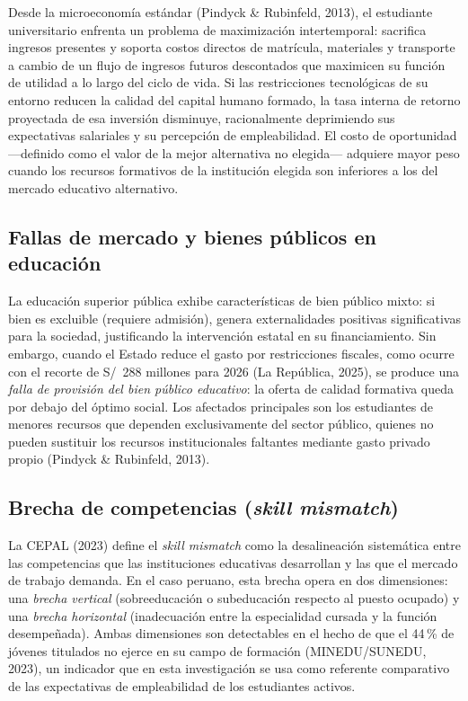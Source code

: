 \documentclass[11pt, a4paper]{article}
\begin{document}
Desde la microeconomía estándar (Pindyck \& Rubinfeld, 2013), el estudiante universitario enfrenta un problema de maximización intertemporal: sacrifica ingresos presentes y soporta costos directos de matrícula, materiales y transporte a cambio de un flujo de ingresos futuros descontados que maximicen su función de utilidad a lo largo del ciclo de vida. Si las restricciones tecnológicas de su entorno reducen la calidad del capital humano formado, la tasa interna de retorno proyectada de esa inversión disminuye, racionalmente deprimiendo sus expectativas salariales y su percepción de empleabilidad. El costo de oportunidad —definido como el valor de la mejor alternativa no elegida— adquiere mayor peso cuando los recursos formativos de la institución elegida son inferiores a los del mercado educativo alternativo.

\subsection{Fallas de mercado y bienes públicos en educación}

La educación superior pública exhibe características de bien público mixto: si bien es excluible (requiere admisión), genera externalidades positivas significativas para la sociedad, justificando la intervención estatal en su financiamiento. Sin embargo, cuando el Estado reduce el gasto por restricciones fiscales, como ocurre con el recorte de S/~288 millones para 2026 (La República, 2025), se produce una \textit{falla de provisión del bien público educativo}: la oferta de calidad formativa queda por debajo del óptimo social. Los afectados principales son los estudiantes de menores recursos que dependen exclusivamente del sector público, quienes no pueden sustituir los recursos institucionales faltantes mediante gasto privado propio (Pindyck \& Rubinfeld, 2013).

\subsection{Brecha de competencias (\textit{skill mismatch})}

La CEPAL (2023) define el \textit{skill mismatch} como la desalineación sistemática entre las competencias que las instituciones educativas desarrollan y las que el mercado de trabajo demanda. En el caso peruano, esta brecha opera en dos dimensiones: una \textit{brecha vertical} (sobreeducación o subeducación respecto al puesto ocupado) y una \textit{brecha horizontal} (inadecuación entre la especialidad cursada y la función desempeñada). Ambas dimensiones son detectables en el hecho de que el 44\,\% de jóvenes titulados no ejerce en su campo de formación (MINEDU/SUNEDU, 2023), un indicador que en esta investigación se usa como referente comparativo de las expectativas de empleabilidad de los estudiantes activos.
\end{document}
